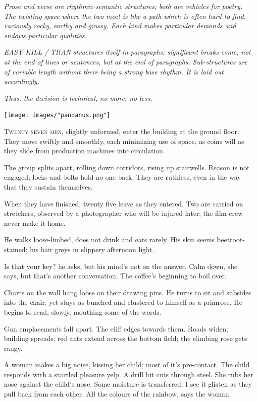 \documentclass[
]{memoir}
\begin{document}
\emph{Prose and verse are rhythmic-semantic structures; both are
vehicles for poetry. The twisting space where the two meet is like a
path which is often hard to find, variously rocky, earthy and grassy.
Each kind makes particular demands and endows particular qualities.}

\textsc{\emph{EASY KILL / TRAN}} \emph{structures itself in paragraphs:
significant breaks come, not at the end of lines or sentences, but at
the end of paragraphs. Sub-structures are of variable length without
there being a strong base rhythm. It is laid out accordingly.}

\emph{Thus, the decision is technical, no more, no less.}

\begin{center}\texttt{[image: images/"pandanus.png"]}\end{center}

\lettrine[lines=3, findent=0em, nindent=0.1em, lhang=0]{T}{wenty seven men,}
slightly unformed, enter the building at the ground floor. They move
swiftly and smoothly, each minimizing use of space, as coins will as
they slide from production machines into circulation.

The group splits apart, rolling down corridors, rising up stairwells.
Reason is not engaged; locks and bolts hold no one back. They are
ruthless, even in the way that they sustain themselves.

When they have finished, twenty five leave as they entered. Two are
carried on stretchers, observed by a photographer who will be injured
later; the film crew never make it home.

He walks loose-limbed, does not drink and eats rarely. His skin seems
beetroot-stained; his hair greys in slippery afternoon light.

Is that your key? he asks, but his mind's not on the answer. Calm down,
she says, but that's another conversation. The coffee's beginning to
boil over.

Charts on the wall hang loose on their drawing pins. He turns to sit and
subsides into the chair, yet stays as bunched and clustered to himself
as a primrose. He begins to read, slowly, mouthing some of the words.

Gun emplacements fall apart. The cliff edges towards them. Roads widen;
building spreads; red ants extend across the bottom field; the climbing
rose gets rangy.

A woman makes a big noise, kissing her child; most of it's pre-contact.
The child responds with a startled pleasure yelp. A drill bit cuts
through steel. She rubs her nose against the child's nose. Some moisture
is transferred. I see it glisten as they pull back from each other. All
the colours of the rainbow, says the woman.
\end{document}
